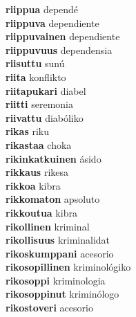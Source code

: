 \textbf{riippua } dependé \\
\textbf{riippuva } dependiente \\
\textbf{riippuvainen } dependiente \\
\textbf{riippuvuus } dependensia \\
\textbf{riisuttu } sunú \\
\textbf{riita } konflikto \\
\textbf{riitapukari } diabel \\
\textbf{riitti } seremonia \\
\textbf{riivattu } diabóliko \\
\textbf{rikas } riku \\
\textbf{rikastaa } choka \\
\textbf{rikinkatkuinen } ásido \\
\textbf{rikkaus } rikesa \\
\textbf{rikkoa } kibra \\
\textbf{rikkomaton } apsoluto \\
\textbf{rikkoutua } kibra \\
\textbf{rikollinen } kriminal \\
\textbf{rikollisuus } kriminalidat \\
\textbf{rikoskumppani } acesorio \\
\textbf{rikosopillinen } kriminológiko \\
\textbf{rikosoppi } kriminologia \\
\textbf{rikosoppinut } kriminólogo \\
\textbf{rikostoveri } acesorio \\
